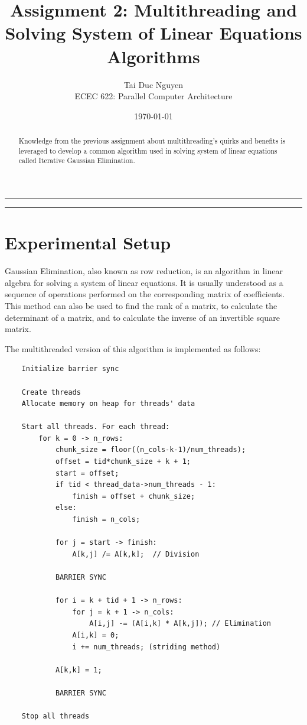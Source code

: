 \documentclass[letterpaper, 11pt]{article}
\title{Assignment 2: Multithreading and Solving System of Linear Equations Algorithms}
\author{
Tai Duc Nguyen \\
ECEC 622: Parallel Computer Architecture
}
\date{\AdvanceDate[-1]\today}
\begin{document}
\maketitle

\rule{\textwidth}{1pt}

\begin{abstract}
	Knowledge from the previous assignment about multithreading's quirks and benefits is leveraged to develop a common algorithm used in solving system of linear equations called Iterative Gaussian Elimination. 
\end{abstract}

\rule{\textwidth}{1pt}

\section{Experimental Setup}

Gaussian Elimination, also known as row reduction, is an algorithm in linear algebra for solving a system of linear equations. It is usually understood as a sequence of operations performed on the corresponding matrix of coefficients. This method can also be used to find the rank of a matrix, to calculate the determinant of a matrix, and to calculate the inverse of an invertible square matrix. 

The multithreaded version of this algorithm is implemented as follows:

\begin{lstlisting}
	Initialize barrier sync
	
	Create threads
	Allocate memory on heap for threads' data
	
	Start all threads. For each thread:
		for k = 0 -> n_rows:
			chunk_size = floor((n_cols-k-1)/num_threads);
			offset = tid*chunk_size + k + 1;
			start = offset;
			if tid < thread_data->num_threads - 1:
				finish = offset + chunk_size;
			else:
				finish = n_cols;
			
			for j = start -> finish:
				A[k,j] /= A[k,k];  // Division
				
			BARRIER SYNC
			
			for i = k + tid + 1 -> n_rows:
				for j = k + 1 -> n_cols:
					A[i,j] -= (A[i,k] * A[k,j]); // Elimination
				A[i,k] = 0;
				i += num_threads; (striding method)

			A[k,k] = 1;
			
			BARRIER SYNC
		
	Stop all threads


\end{lstlisting}
\end{document}
